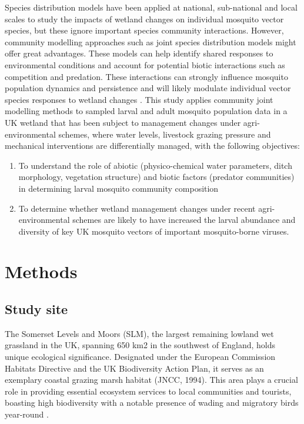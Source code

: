 \documentclass[lineno,sn-basic]{sn-jnl}%
\begin{document}
Species distribution models have been applied at national, sub-national and local scales to study the impacts of wetland changes on individual mosquito vector species, but these ignore important species community interactions. However, community modelling approaches such as joint species distribution models \citep{goldingBayesCommBayesianCommunity2015, ovaskainenHowMakeMore2017, pichlerNewJointSpecies2021} might offer great advantages. These models can help identify shared responses to environmental conditions \citep{poggiatoInterpretationsJointModeling2021} and account for potential biotic interactions such as competition and predation. These interactions can strongly influence mosquito population dynamics and persistence \citep{beketovPredationRiskPerception2007a, braksInterspecificCompetitionTwo2004, sahaPredationPotentialOdonates2012} and will likely modulate individual vector species responses to wetland changes \citep{reyNorthAmericanWetlands2012}. 
This study applies community joint modelling methods to sampled larval and adult mosquito population data in a UK wetland that has been subject to management changes under agri-environmental schemes, where water levels, livestock grazing pressure and mechanical interventions are differentially managed, with the following objectives: 

\begin{enumerate}
    \item To understand the role of abiotic (physico-chemical water parameters, ditch morphology, vegetation structure) and biotic factors (predator communities) in determining larval mosquito community composition
    \item To determine whether wetland management changes under recent agri-environmental schemes are likely to have increased the larval abundance and diversity of key UK mosquito vectors of important mosquito-borne viruses.
\end{enumerate}

\section{Methods}\label{sec2}

\subsection{Study site}\label{subsec-study}

The Somerset Levels and Moors (SLM), the largest remaining lowland wet grassland in the UK, spanning 650 km2 in the southwest of England, holds unique ecological significance. Designated under the European Commission Habitats Directive and the UK Biodiversity Action Plan, it serves as an exemplary coastal grazing marsh habitat (JNCC, 1994). This area plays a crucial role in providing essential ecosystem services to local communities and tourists, boasting high biodiversity with a notable presence of wading and migratory birds year-round \citep{acremanTradeoffEcosystemServices2011}.
\end{document}
